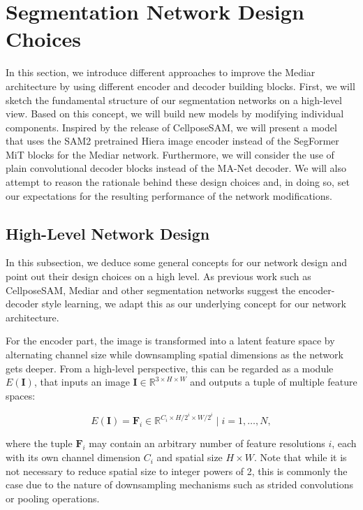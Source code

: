 \section{Segmentation Network Design Choices}

In this section, we introduce different approaches to improve the Mediar architecture by using different encoder and decoder building blocks. First, we will sketch the fundamental structure of our segmentation networks on a high-level view. Based on this concept, we will build new models by modifying individual components. Inspired by the release of CellposeSAM, we will present a model that uses the SAM2 pretrained Hiera image encoder instead of the SegFormer MiT blocks for the Mediar network. Furthermore, we will consider the use of plain convolutional decoder blocks instead of the MA-Net decoder. We will also attempt to reason the rationale behind these design choices and, in doing so, set our expectations for the resulting performance of the network modifications.

\subsection{High-Level Network Design}

In this subsection, we deduce some general concepts for our network design and point out their design choices on a high level. As previous work such as CellposeSAM, Mediar and other segmentation networks suggest the encoder-decoder style learning, we adapt this as our underlying concept for our network architecture. 

For the encoder part, the image is transformed into a latent feature space by alternating channel size while downsampling spatial dimensions as the network gets deeper. From a high-level perspective, this can be regarded as a module $E(\mathbf{I})$, that inputs an image $\mathbf{I} \in \mathbb{R}^{3 \times H \times W}$ and outputs a tuple of multiple feature spaces:

\begin{equation}
E(\mathbf{I}) =
{\mathbf{F}_i \in \mathbb{R}^{C_i \times H/{2^i} \times W/{2^i}} \mid i = 1, \dots, N },
\end{equation}

where the tuple $\mathbf{F}_i$ may contain an arbitrary number of feature resolutions $i$, each with its own channel dimension $C_i$ and spatial size $H \times W$. Note that while it is not necessary to reduce spatial size to integer powers of 2, this is commonly the case due to the nature of downsampling mechanisms such as strided convolutions or pooling operations.

